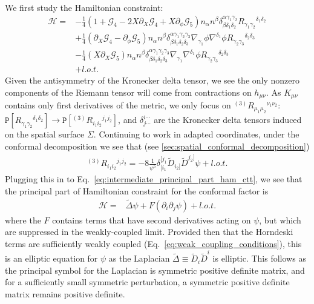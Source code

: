 \documentclass{ws-ijmpd}
\begin{document}
We first study the Hamiltonian constraint:
\begin{align}
\label{eq:intermediate_principal_part_ham_ctt}
   \mathcal{H}
   =&
   -
   \frac{1}{4}\left(
      1 
      + 
      \mathcal{G}_4 
      - 
      2X\partial_X\mathcal{G}_4 
      + 
      X \partial_{\phi}\mathcal{G}_5
   \right)
   n_{\alpha}n^{\beta}
   \delta^{\alpha\gamma_1\gamma_2}_{\beta\delta_1\delta_2}
   R_{\gamma_1\gamma_2}{}^{\delta_1\delta_2}
   \nonumber\\
   &+
   \frac{1}{4}\left(
      \partial_X\mathcal{G}_4
      -
      \partial_{\phi}\mathcal{G}_5
   \right)
   n_{\alpha}n^{\beta}
   \delta^{\alpha\gamma_1\gamma_2\gamma_3}_{\beta\delta_1\delta_2\delta_3}
   \nabla_{\gamma_1}\phi\nabla^{\delta_1}\phi
   R_{\gamma_2\gamma_3}{}^{\delta_2\delta_3}
   \nonumber\\
   &-
   \frac{1}{4}
   \left(X\partial_X\mathcal{G}_5\right)
   n_{\alpha}n^{\beta}
   \delta^{\alpha\gamma_1\gamma_2\gamma_3}_{\beta\delta_1\delta_2\delta_3}
   \nabla_{\gamma_1}\nabla^{\delta_1}\phi
   R_{\gamma_2\gamma_3}{}^{\delta_2\delta_3}
   \nonumber\\
   &+
   l.o.t.
\end{align}
Given the antisymmetry of the Kronecker delta tensor, we see
the only nonzero components of the Riemann tensor will come
from contractions on $h_{\mu\nu}$.
As $K_{\mu\nu}$ contains only first derivatives of the metric,
we only focus on ${}^{(3)}R_{\mu_1\mu_2}{}^{\nu_1\nu_2}$:
$\mathtt{P}\left[R_{\gamma_1\gamma_2}{}^{\delta_1\delta_2}\right] 
\to
\mathtt{P}\left[{}^{(3)}R_{i_1i_2}{}^{j_1j_2}\right]
$,
and $\delta^{i\cdots}_{j\cdots}$ are the Kronecker delta tensors
induced on the spatial surface $\Sigma$.
Continuing to work in adapted coordinates, 
under the conformal decomposition we see that
(see \ref{sec:spatial_conformal_decomposition})
\begin{align}
   {}^{(3)}R_{i_1i_2}{}^{j_1j_2}
   =
   -
   8
   \frac{1}{\psi^5}
   \delta^{[j_1}_{[i_1}\tilde{D}_{i_2]}\tilde{D}^{j_2]}\psi
   +
   l.o.t.
\end{align}
Plugging this in to 
Eq.~\eqref{eq:intermediate_principal_part_ham_ctt},
we see that the principal part of Hamiltonian constraint
for the conformal factor is
\begin{align}
   \mathcal{H}
   =&
   \tilde{\Delta}\psi
   +
   F\left(\partial_i\partial_j\psi\right)
   +
   l.o.t.
\end{align}
where the $F$ contains terms that have second derivatives acting
on $\psi$, but which are suppressed in the weakly-coupled limit.
Provided then that the Horndeski terms are sufficiently weakly coupled 
(Eq.~\eqref{eq:weak_coupling_conditions}), 
this is an elliptic equation for $\psi$ as the
Laplacian $\tilde{\Delta}\equiv\tilde{D}_i\tilde{D}^i$ is 
elliptic. This follows as the principal symbol for the Laplacian is symmetric
positive definite matrix, and for a sufficiently 
small symmetric perturbation,
a symmetric positive definite matrix remains positive definite.
\end{document}
